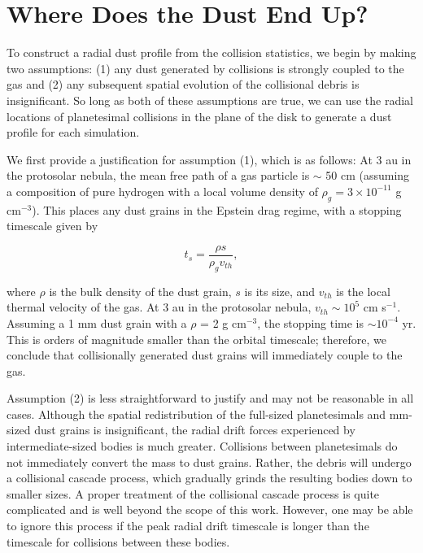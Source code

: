 \section{Where Does the Dust End Up?}\label{sec:dust}

To construct a radial dust profile from the collision statistics, we begin by making two assumptions: (1) any dust generated by 
collisions is strongly coupled to the gas and (2) any subsequent spatial evolution of the collisional debris is insignificant. So long 
as both of these assumptions are true, we can use the radial locations of planetesimal collisions in the plane of the disk to 
generate a dust profile for each simulation.

We first provide a justification for assumption (1), which is as follows: At 3 au in the protosolar nebula, the mean free path of a 
gas particle is $\sim$ 50 cm (assuming a composition of pure hydrogen with a local volume density of $\rho_{g} = 3 \times 
10^{-11}$ g cm$^{-3}$). This places any dust grains in the Epstein drag regime, with a stopping timescale given by

\begin{equation}\label{eq:ts_epstein}
    t_{s} = \frac{\rho s}{\rho_{g} v_{th}},
\end{equation}

\noindent where $\rho$ is the bulk density of the dust grain, $s$ is its size, and $v_{th}$ is the local thermal velocity of the gas. 
At 3 au in the protosolar nebula, $v_{th} \sim 10^{5}$ cm s$^{-1}$. Assuming a 1 mm dust grain with a $\rho$ = 2 g cm$^{-3}$, 
the stopping time is $\sim 10^{-4}$ yr.  This is orders of magnitude smaller than the orbital timescale; therefore, we conclude that 
collisionally generated dust grains will immediately couple to the gas.

Assumption (2) is less straightforward to justify and may not be reasonable in all cases. Although the spatial redistribution of the 
full-sized planetesimals and mm-sized dust grains is insignificant, the radial drift forces experienced by intermediate-sized bodies 
is much greater. Collisions between planetesimals do not immediately convert the mass to dust grains. Rather, the debris will 
undergo a collisional cascade process, which gradually grinds the resulting bodies down to smaller sizes. A proper treatment of 
the collisional cascade process is quite complicated and is well beyond the scope of this work. However, one may be able to 
ignore this process if the peak radial drift timescale is longer than the timescale for collisions between these bodies.

